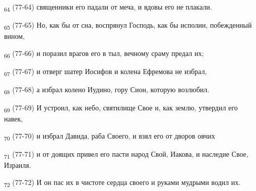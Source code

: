 \begin{tcolorbox}
\textsubscript{64} (77-64) священники его падали от меча, и вдовы его не плакали.
\end{tcolorbox}
\begin{tcolorbox}
\textsubscript{65} (77-65) Но, как бы от сна, воспрянул Господь, как бы исполин, побежденный вином,
\end{tcolorbox}
\begin{tcolorbox}
\textsubscript{66} (77-66) и поразил врагов его в тыл, вечному сраму предал их;
\end{tcolorbox}
\begin{tcolorbox}
\textsubscript{67} (77-67) и отверг шатер Иосифов и колена Ефремова не избрал,
\end{tcolorbox}
\begin{tcolorbox}
\textsubscript{68} (77-68) а избрал колено Иудино, гору Сион, которую возлюбил.
\end{tcolorbox}
\begin{tcolorbox}
\textsubscript{69} (77-69) И устроил, как небо, святилище Свое и, как землю, утвердил его навек,
\end{tcolorbox}
\begin{tcolorbox}
\textsubscript{70} (77-70) и избрал Давида, раба Своего, и взял его от дворов овчих
\end{tcolorbox}
\begin{tcolorbox}
\textsubscript{71} (77-71) и от доящих привел его пасти народ Свой, Иакова, и наследие Свое, Израиля.
\end{tcolorbox}
\begin{tcolorbox}
\textsubscript{72} (77-72) И он пас их в чистоте сердца своего и руками мудрыми водил их.
\end{tcolorbox}
